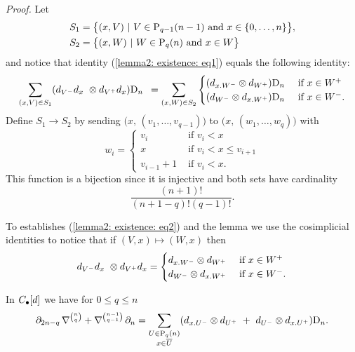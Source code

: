 \textit{Proof.}
Let
\begin{align*}
& S_1 = \big\{(x, V)\ |\ V\in\P_{q-1}(n-1) \text{ and } x\in\{0,\dots,n\}\big\}, \\
& S_2 = \big\{(x, W)\ |\ W\in\P_{q}(n) \text{ and } x\in W\big\}
\end{align*}
and notice that identity (\ref{lemma2: existence: eq1}) equals the following identity:
\begin{equation} \label{lemma2: existence: eq2}
\sum_{(x,V) \in S_1} (d_{V^-}d_x\ \tensor d_{V^+}d_x) \D_n \ \, = 
\sum_{(x,W) \in S_2} 
\begin{cases}
(d_{x.W^-} \tensor d_{W^+}) \D_n & \text{ if } x\in W^+\\
(d_{W^-} \tensor d_{x.W^+}) \D_n & \text{ if } x\in W^-.
\end{cases}
\end{equation}	
Define $S_1 \to S_2$ by sending $\big(x,\, (v_1, \dots, v_{q-1}) \big)$ to $\big(x,\, (w_1, \dots, w_{q}) \big)$ with
\begin{equation*}
w_i = 
\begin{cases}
v_i & \text{ if } v_i < x \\
x & \text{ if } v_i < x \leq v_{i+1} \\
v_{i-1}+1 & \text{ if } v_i < x.
\end{cases}
\end{equation*} 
This function is a bijection since it is injective and both sets have cardinality 
\begin{equation*}
\frac{(n+1)!}{(n+1-q)!(q-1)!}.
\end{equation*}

To establishes (\ref{lemma2: existence: eq2}) and the lemma we use the cosimplicial identities to notice that if $(V,x) \mapsto (W,x)$ then
\begin{equation*}
d_{V^-}d_x\ \tensor d_{V^+}d_x =
\begin{cases}
d_{x.W^-} \tensor d_{W^+} & \text{ if } x\in W^+\\
d_{W^-} \tensor d_{x.W^+} & \text{ if } x\in W^-.
\end{cases}
\end{equation*}

\begin{lemma} \label{lemma3: existence}
	In $\chains[d]$ we have for $0 \leq q \leq n$
	\begin{equation} \label{lemma3: existence: eq1}
	\partial_{2n-q}\,\nabla^{n \choose q} + \nabla^{n-1 \choose q-1}\,\partial_n = 
	\sum_{\substack{U\in\P_{q}(n) \\ x\in\overline{U}}} (d_{x.U^-} \tensor d_{U^+}\ +\ d_{U^-} \tensor d_{x.U^+})\D_n.
	\end{equation}
\end{lemma}

